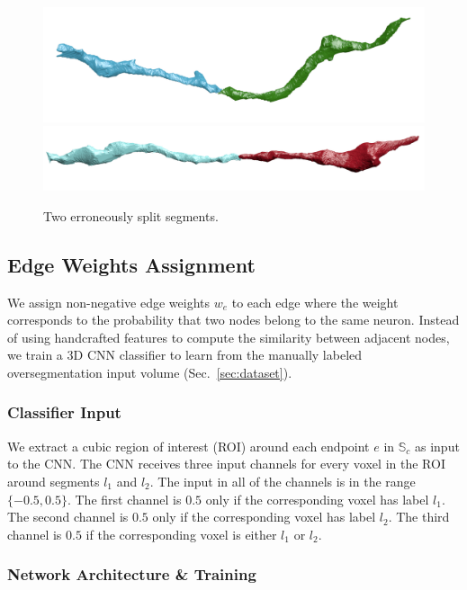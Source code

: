 \begin{figure}[t]
	\centering
	\includegraphics[width=0.92\linewidth]{./figures/split_error1.png}
	\includegraphics[width=0.92\linewidth]{./figures/split_error2.png}
	\caption{Two erroneously split segments.}
	\label{fig:merge_candidates}
\end{figure}

\subsection{Edge Weights Assignment}
We assign non-negative edge weights $w_e$ to each edge where the weight corresponds to the probability that two nodes belong to the same neuron.
Instead of using handcrafted features to compute the similarity between adjacent nodes, we train a 3D CNN classifier to learn from the manually labeled oversegmentation input volume (Sec.~\ref{sec:dataset}).

\subsubsection{Classifier Input}

We extract a cubic region of interest (ROI) around each endpoint $e$ in $\mathbb{S}_c$ as input to the CNN. The CNN receives three input channels for every voxel in the ROI around segments $l_1$ and $l_2$. The input in all of the channels is in the range $\{-0.5, 0.5\}$. The first channel is $0.5$ only if the corresponding voxel has label $l_1$. The second channel is $0.5$ only if the corresponding voxel has label $l_2$. The third channel is $0.5$ if the corresponding voxel is either $l_1$ or $l_2$.

\subsubsection{Network Architecture \& Training}

